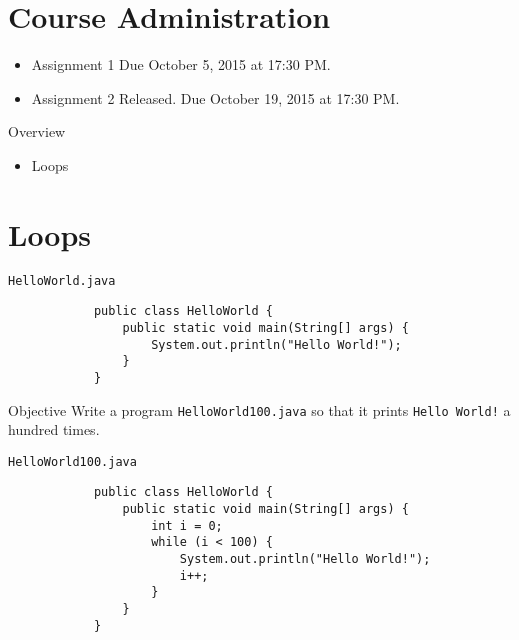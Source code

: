 \documentclass[10pt, compress]{beamer}
\begin{document}
\prepareCover

\section{Course Administration}

\begin{slide}
	\begin{itemize}
		\item[] Assignment 1 Due October 5, 2015 at 17:30 PM.
		\item[] Assignment 2 Released. Due October 19, 2015 at 17:30 PM.
	\end{itemize}
\end{slide}

\begin{slide}
	\begin{block}{Overview}
		\begin{itemize}
			\item[] Loops
		\end{itemize}
	\end{block}
\end{slide}

\section{Loops}

\begin{slide}
	\begin{block}{\texttt{HelloWorld.java}}
		\begin{verbatim}
			public class HelloWorld {
			    public static void main(String[] args) {
			        System.out.println("Hello World!");
			    }
			}
		\end{verbatim}
	\end{block}
	\begin{block}{Objective}
		Write a program \texttt{HelloWorld100.java} so that it prints \texttt{Hello World!} a hundred times.
	\end{block}
\end{slide}

\begin{slide}
	\begin{block}{\texttt{HelloWorld100.java}}
		\begin{verbatim}
			public class HelloWorld {
			    public static void main(String[] args) {
			        int i = 0;
			        while (i < 100) {
			            System.out.println("Hello World!");
			            i++;
			        }
			    }
			}
		\end{verbatim}
	\end{block}
\end{slide}
\end{document}
